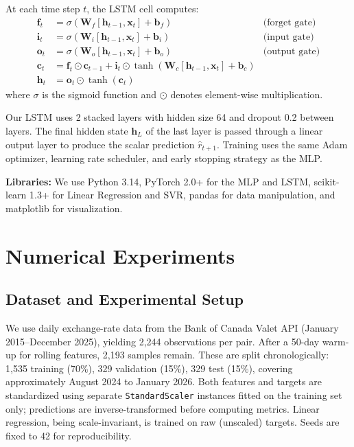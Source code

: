 \documentclass{article}
\begin{document}
At each time step $t$, the LSTM cell computes:
\begin{align}
  \mathbf{f}_t &= \sigma(\mathbf{W}_f [\mathbf{h}_{t-1}, \mathbf{x}_t] + \mathbf{b}_f) & \text{(forget gate)} \\
  \mathbf{i}_t &= \sigma(\mathbf{W}_i [\mathbf{h}_{t-1}, \mathbf{x}_t] + \mathbf{b}_i) & \text{(input gate)} \\
  \mathbf{o}_t &= \sigma(\mathbf{W}_o [\mathbf{h}_{t-1}, \mathbf{x}_t] + \mathbf{b}_o) & \text{(output gate)} \\
  \mathbf{c}_t &= \mathbf{f}_t \odot \mathbf{c}_{t-1} + \mathbf{i}_t \odot \tanh(\mathbf{W}_c [\mathbf{h}_{t-1}, \mathbf{x}_t] + \mathbf{b}_c) \\
  \mathbf{h}_t &= \mathbf{o}_t \odot \tanh(\mathbf{c}_t)
\end{align}
where $\sigma$ is the sigmoid function and $\odot$ denotes element-wise multiplication.

Our LSTM uses 2 stacked layers with hidden size 64 and dropout 0.2 between layers. The final hidden state $\mathbf{h}_L$ of the last layer is passed through a linear output layer to produce the scalar prediction $\hat{r}_{t+1}$. Training uses the same Adam optimizer, learning rate scheduler, and early stopping strategy as the MLP.

\textbf{Libraries:} We use Python 3.14, PyTorch 2.0+ for the MLP and LSTM, scikit-learn 1.3+ for Linear Regression and SVR, pandas for data manipulation, and matplotlib for visualization.


\section{Numerical Experiments}

\subsection{Dataset and Experimental Setup}

We use daily exchange-rate data from the Bank of Canada Valet API (January 2015--December 2025), yielding 2,244 observations per pair. After a 50-day warm-up for rolling features, 2,193 samples remain. These are split chronologically: 1,535 training (70\%), 329 validation (15\%), 329 test (15\%), covering approximately August 2024 to January 2026. Both features and targets are standardized using separate \texttt{StandardScaler} instances fitted on the training set only; predictions are inverse-transformed before computing metrics. Linear regression, being scale-invariant, is trained on raw (unscaled) targets. Seeds are fixed to 42 for reproducibility.
\end{document}
